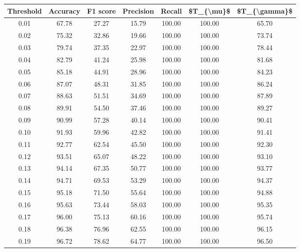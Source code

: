 \begin{tabular}{|c|c|c|c|c|c|c|}
\hline
 Threshold &  Accuracy &  F1 score &  Precision &  Recall &  \$T\_\{\textbackslash mu\}\$ &  \$T\_\{\textbackslash gamma\}\$ \\
\hline
      0.01 &     67.78 &     27.27 &      15.79 &  100.00 &     100.00 &         65.70 \\
      0.02 &     75.32 &     32.86 &      19.66 &  100.00 &     100.00 &         73.74 \\
      0.03 &     79.74 &     37.35 &      22.97 &  100.00 &     100.00 &         78.44 \\
      0.04 &     82.79 &     41.24 &      25.98 &  100.00 &     100.00 &         81.68 \\
      0.05 &     85.18 &     44.91 &      28.96 &  100.00 &     100.00 &         84.23 \\
      0.06 &     87.07 &     48.31 &      31.85 &  100.00 &     100.00 &         86.24 \\
      0.07 &     88.63 &     51.51 &      34.69 &  100.00 &     100.00 &         87.89 \\
      0.08 &     89.91 &     54.50 &      37.46 &  100.00 &     100.00 &         89.27 \\
      0.09 &     90.99 &     57.28 &      40.14 &  100.00 &     100.00 &         90.41 \\
      0.10 &     91.93 &     59.96 &      42.82 &  100.00 &     100.00 &         91.41 \\
      0.11 &     92.77 &     62.54 &      45.50 &  100.00 &     100.00 &         92.30 \\
      0.12 &     93.51 &     65.07 &      48.22 &  100.00 &     100.00 &         93.10 \\
      0.13 &     94.14 &     67.35 &      50.77 &  100.00 &     100.00 &         93.77 \\
      0.14 &     94.71 &     69.53 &      53.29 &  100.00 &     100.00 &         94.37 \\
      0.15 &     95.18 &     71.50 &      55.64 &  100.00 &     100.00 &         94.88 \\
      0.16 &     95.63 &     73.44 &      58.03 &  100.00 &     100.00 &         95.35 \\
      0.17 &     96.00 &     75.13 &      60.16 &  100.00 &     100.00 &         95.74 \\
      0.18 &     96.38 &     76.96 &      62.55 &  100.00 &     100.00 &         96.15 \\
      0.19 &     96.72 &     78.62 &      64.77 &  100.00 &     100.00 &         96.50 \\

\end{tabular}
